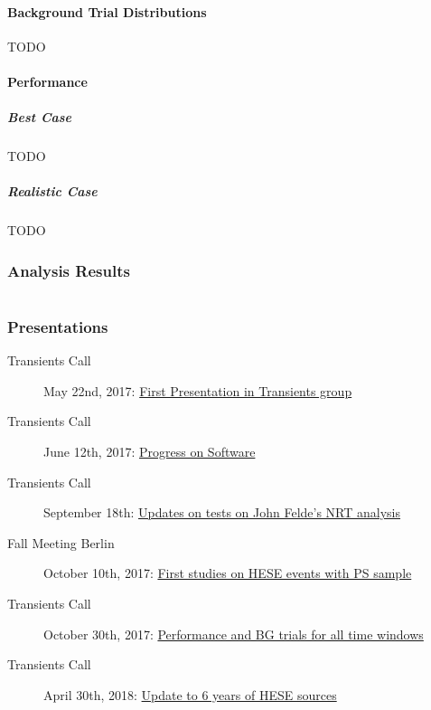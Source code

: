 \subsection{Background Trial Distributions}
TODO

\subsection{Performance}
\subsubsection{Best Case}
TODO
\subsubsection{Realistic Case}
TODO


\section{Analysis Results}



\appendix
\part*{\appendixname}
\section{Presentations}
\begin{description}
  \item[Transients Call] May 22nd, 2017: \href{https://drive.google.com/file/d/0B_Gkg-MCR-1za1RMbjlzTFE0YVU/view}{First Presentation in Transients group}
  \item[Transients Call] June 12th, 2017: \href{https://drive.google.com/file/d/0B_Gkg-MCR-1zTFI3Umg3XzZrSE0/view}{Progress on Software}
  \item[Transients Call] September 18th: \href{https://drive.google.com/file/d/0B_Gkg-MCR-1zR28tTmhBT3VYTGs/view}{Updates on tests on John Felde's NRT analysis}
  \item[Fall Meeting Berlin] October 10th, 2017: \href{https://events.icecube.wisc.edu/getFile.py/access?contribId=37&sessionId=32&resId=0&materialId=slides&confId=90}{First studies on HESE events with PS sample}
  \item[Transients Call] October 30th, 2017: \href{https://drive.google.com/file/d/0B_Gkg-MCR-1zOFdkajczT3JWNUU/view}{Performance and BG trials for all time windows}
  \item[Transients Call] April 30th, 2018: \href{https://drive.google.com/file/d/12vOMOpt1nMrmnBdM_4wV5sMdg0FUJLqF/view}{Update to 6 years of HESE sources}
\end{description}

